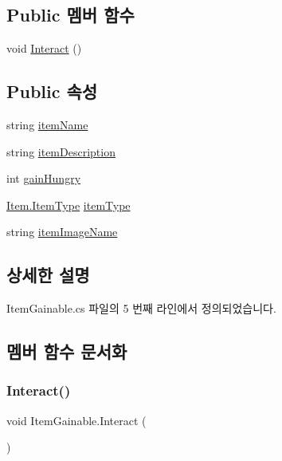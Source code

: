 \subsection*{Public 멤버 함수}
\begin{DoxyCompactItemize}
\item 
void \mbox{\hyperlink{class_item_gainable_a693eecdbed67e3edfcbd838f1496095c}{Interact}} ()
\end{DoxyCompactItemize}
\subsection*{Public 속성}
\begin{DoxyCompactItemize}
\item 
string \mbox{\hyperlink{class_item_gainable_a3affbda30d99a3ef6bb2be55ed27784b}{item\+Name}}
\item 
string \mbox{\hyperlink{class_item_gainable_ab02884b73669e6b16be637e13809099e}{item\+Description}}
\item 
int \mbox{\hyperlink{class_item_gainable_aad6231e1e649c4ad31fa2114d4c2ff84}{gain\+Hungry}}
\item 
\mbox{\hyperlink{class_item_ab5eeb575e9d66ebcfef9b58b667fad05}{Item.\+Item\+Type}} \mbox{\hyperlink{class_item_gainable_a4e67d5e2a3aa8a8f4f15d7aa45880eda}{item\+Type}}
\item 
string \mbox{\hyperlink{class_item_gainable_a134053b3639f136a434f1331c15cbc53}{item\+Image\+Name}}
\end{DoxyCompactItemize}


\subsection{상세한 설명}


Item\+Gainable.\+cs 파일의 5 번째 라인에서 정의되었습니다.



\subsection{멤버 함수 문서화}
\mbox{\label{class_item_gainable_a693eecdbed67e3edfcbd838f1496095c}} 
\subsubsection{\texorpdfstring{Interact()}{Interact()}}
{\footnotesize\ttfamily void Item\+Gainable.\+Interact (\begin{DoxyParamCaption}{ }\end{DoxyParamCaption})}



